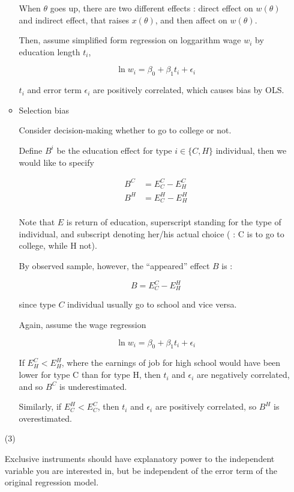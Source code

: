 \documentclass{jsarticle}
\begin{document}
\begin{enumerate}
\begin{itemize}
  When $\theta$ goes up, there are two different effects : direct effect on $w(\theta)$ and indirect effect, that raises $x(\theta)$, and then affect on $w(\theta)$.
  
  Then, assume simplified form regression on loggarithm wage $w_i$ by education length $t_i$,
  
  \[ \ln w_i = \beta_0 + \beta_1 t_i + \epsilon_i \]
  
  $t_i$ and error term $\epsilon_i$ are positively correlated, which causes bias by OLS.
  
  \item Selection bias
  
  Consider decision-making whether to go to college or not.
  
  Define $B^i$ be the education effect for type $i \in \{ C, H \}$ individual, then we would like to specify
  
   \begin{align*}
   B^C &= E_C^C - E_H^C \\
   B^H &= E_C^H - E_H^H \\
   \end{align*}
  
  Note that $E$ is return of education, superscript standing for the type of individual, and subscript denoting her/his actual choice ( : C is to go to college, while H not).
  
  By observed sample, however, the ``appeared'' effect $B$ is :
  
  \[ B = E_C^C - E_H^H \]
  
  since type $C$ individual usually go to school and vice versa.
  
  Again, assume the wage regression
  
  \[ \ln w_i = \beta_0 + \beta_1 t_i + \epsilon_i \]
  
  If $E_H^C < E_H^H$, where the earnings of job for high school would have been lower for type C than for type H, then $t_i$ and $\epsilon_i$ are negatively correlated, and so $B^C$ is underestimated.
  
  Similarly, if $E_C^H < E_C^C$, then $t_i$ and $\epsilon_i$ are positively correlated, so $B^H$ is overestimated.
  
  \end{itemize}
 
 (3)
 
 Exclusive instruments should have explanatory power to the independent variable you are interested in, but be independent of the error term of the original regression model.
 

\end{enumerate}
\end{document}
